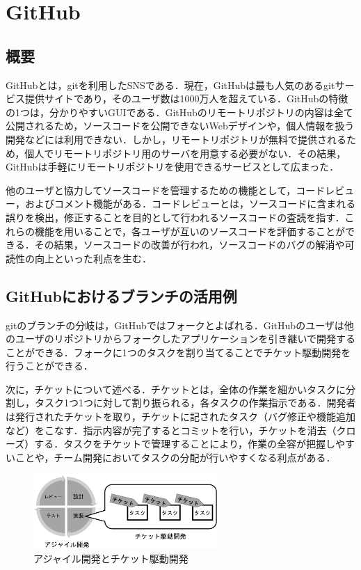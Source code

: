 \documentclass[a4j,9pt,twocolumn]{jsarticle}
\begin{document}
\section{GitHub}
\subsection{概要}
GitHubとは，gitを利用したSNSである．現在，GitHubは最も人気のあるgitサービス提供サイトであり，そのユーザ数は1000万人を超えている\cite{github}．GitHubの特徴の1つは，分かりやすいGUIである．GitHubのリモートリポジトリの内容は全て公開されるため，ソースコードを公開できないWebデザインや，個人情報を扱う開発などには利用できない．しかし，リモートリポジトリが無料で提供されるため，個人でリモートリポジトリ用のサーバを用意する必要がない．その結果，GitHubは手軽にリモートリポジトリを使用できるサービスとして広まった．

他のユーザと協力してソースコードを管理するための機能として，コードレビュー，およびコメント機能がある．コードレビューとは，ソースコードに含まれる誤りを検出，修正することを目的として行われるソースコードの査読を指す．これらの機能を用いることで，各ユーザが互いのソースコードを評価することができる．その結果，ソースコードの改善が行われ，ソースコードのバグの解消や可読性の向上といった利点を生む．

\subsection{GitHubにおけるブランチの活用例}
gitのブランチの分岐は，GitHubではフォークとよばれる．GitHubのユーザは他のユーザのリポジトリからフォークしたアプリケーションを引き継いで開発することができる．フォークに1つのタスクを割り当てることでチケット駆動開発を行うことができる．

次に，チケットについて述べる．チケットとは，全体の作業を細かいタスクに分割し，タスク1つ1つに対して割り振られる，各タスクの作業指示である．開発者は発行されたチケットを取り，チケットに記されたタスク（バグ修正や機能追加など）をこなす．指示内容が完了するとコミットを行い，チケットを消去（クローズ）する．タスクをチケットで管理することにより，作業の全容が把握しやすいことや，チーム開発においてタスクの分配が行いやすくなる利点がある．

\begin{figure}[h]
\centering
\includegraphics[width=70mm]{img/dev.eps}
\caption{アジャイル開発とチケット駆動開発}
\label{dev}
\end{figure}
\end{document}
